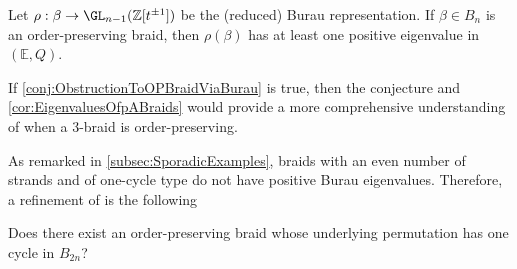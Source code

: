 \documentclass{amsart}
\begin{document}
\begin{conj}\label{conj:ObstructionToOPBraidViaBurau}
    Let $\rho:\beta \to \GL_{n-1}(\mathbb{Z}[t^{\pm 1}])$ be the (reduced) Burau representation. If $\beta \in B_n$ is an order-preserving braid, then $\rho(\beta)$ has at least one positive eigenvalue in $(\mathbb{E},Q)$.
\end{conj}
\noindent
If \cref{conj:ObstructionToOPBraidViaBurau} is true, then the conjecture and \cref{cor:EigenvaluesOfpABraids} would provide a more comprehensive understanding of when a 3-braid is order-preserving. 

As remarked in \cref{subsec:SporadicExamples}, braids with an even number of strands and of one-cycle type do not have positive Burau eigenvalues. Therefore, a refinement of \cite[Question 6.1]{KinRolfsen18} is the following

\begin{quest}
    Does there exist an order-preserving braid whose underlying permutation has one cycle in $B_{2n}$?
\end{quest}




\printbibliography
\end{document}
